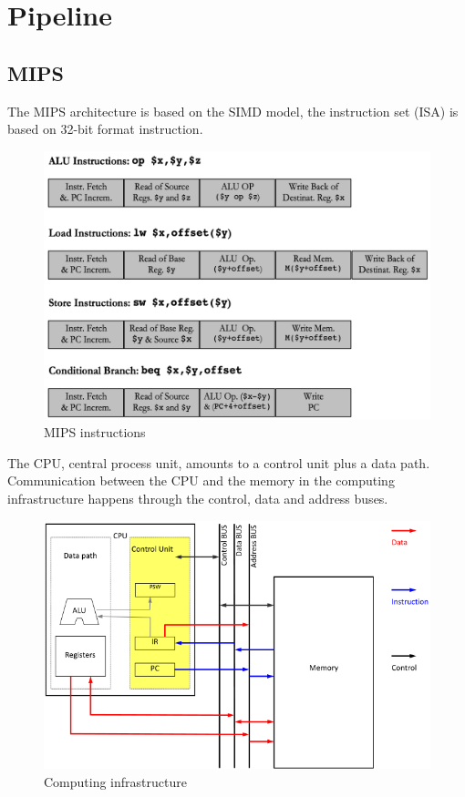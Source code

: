 
\section{Pipeline}\label{sec:pipeline}

\subsection{MIPS}\label{subsec:heterogeneous-systems}
The MIPS architecture is based on the SIMD model, the instruction set (ISA) is based on 32-bit format instruction.
\begin{figure}[h]
    \centering
    \includegraphics[scale=0.3]{images/MIPS-instructions}
    \caption{MIPS instructions}
    \label{fig: MIPS instructions}
\end{figure}

The CPU, central process unit, amounts to a control unit plus a data path.
Communication between the CPU and the memory in the computing infrastructure happens through the control, data and
address buses.

\begin{figure}[h]
    \centering
    \includegraphics[scale = 0.3]{images/computing-infrastructure}
    \caption{Computing infrastructure}
    \label{fig:computing-infrastructure}
\end{figure}

